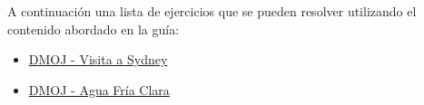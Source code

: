A continuación una lista de ejercicios que se pueden resolver utilizando el contenido abordado en la guía:

\begin{itemize}
	\item \href{https://dmoj.uclv.edu.cu/problem/obilazak}{DMOJ - Visita a Sydney}
	\item \href{https://dmoj.uclv.edu.cu/problem/coldwat}{DMOJ - Agua Fría Clara}
\end{itemize}